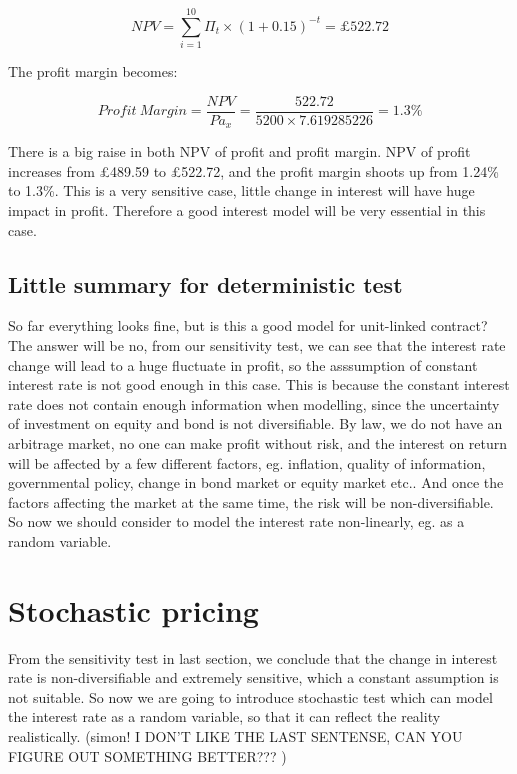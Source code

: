 \documentclass{report}
\begin{document}
\[
 NPV=\sum_{i=1}^{10} \Pi_t \times (1+0.15)^{-t} = \pounds522.72
\]
 
The profit margin becomes:


\[
Profit\ Margin =  \frac{NPV}{P \ddot{a}_x} = \frac{522.72}{5200 \times 7.619285226} = 1.3\%
\]

There is a big raise in both NPV of profit and profit margin. NPV of profit increases from \pounds489.59 to \pounds522.72, and the profit margin shoots up from 1.24\% to 1.3\%. This is a very sensitive case, little change in interest will have huge impact in profit. Therefore a good interest model will be very essential in this case.
 





\subsection{Little summary for deterministic test}
So far everything looks fine, but is this a good model for unit-linked contract? The answer will be no, from our sensitivity test, we can see that the interest rate change will lead to a huge fluctuate in profit, so the asssumption of constant interest rate is not good enough in this case. This is because the constant interest rate does not contain  enough information when modelling, since the uncertainty of investment on equity and bond is not diversifiable. By law, we do not have an arbitrage market, no one can make profit without risk, and the interest on return will be affected by a few different factors, \cite{bib:riskfactor} eg. inflation, quality of information, governmental policy, change in bond market or equity market etc.. And once the factors affecting the market at the same time, the risk will be non-diversifiable. So now we should consider to model the interest rate non-linearly, eg. as a random variable. 




\section{Stochastic pricing}

From the sensitivity test in last section, we conclude that the change in interest rate is non-diversifiable and extremely sensitive, which a constant assumption is not suitable. So now we are going to introduce stochastic test which can model the interest rate as a random variable, so that it can reflect the reality realistically.  (simon! I DON'T LIKE THE LAST SENTENSE, CAN YOU FIGURE OUT SOMETHING BETTER??? )
\end{document}
